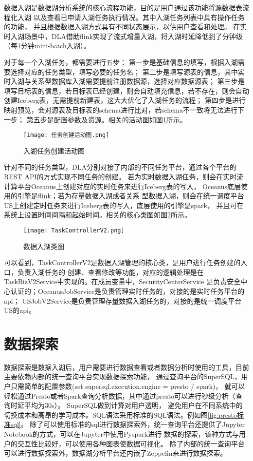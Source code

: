 数据入湖是数据湖分析系统的核心流程功能，目的是用户通过该功能将源数据表流程化入湖
以及查看已申请入湖任务执行情况。其中入湖任务列表中具有操作任务的功能，
并且根据数据入湖方式具有不同状态展示，以供用户查看和处理。
在实时入湖场景中，DLA借助flink实现了流式增量入湖，将入湖时延降低到了分钟级（每1分钟mini-batch入湖）。

对于每一个入湖任务，都需要进行五步：
第一步是基础信息的填写，根据入湖需要选择对应的任务类型，填写必要的任务名；
第二步是填写源表的信息，其中实时入湖与关系型数据库入湖需要提前注册数据源，选择对应数据源表；
第三步是填写目标表的信息，若目标表已经创建，则会自动填充信息，若不存在，则会自动创建Iceberg表，无需提前新建表，这大大优化了入湖任务的流程；
第四步是进行映射预览，会对源表及目标表的schema进行比对，若schema不一致将无法进行下一步；
第五步是配置参数及资源。相关的活动图如图\ref{fig:任务创建活动图}所示。

\begin{figure}[H]
  \centering
  \texttt{[image: 任务创建活动图.png]}
  \caption{入湖任务创建活动图}
  \label{fig:任务创建活动图}
\end{figure}

针对不同的任务类型，DLA分别对接了内部的不同任务平台，通过各个平台的REST API的方式实现不同任务的创建。
若为实时数据入湖任务，则会在实时流计算平台Oceanus上创建对应的实时任务来进行Iceberg表的写入，
Oceanus底层使用的引擎是flink；若为存量数据入湖或者关系
型数据入湖，则会在统一调度平台US上创建定时任务来进行Iceberg表的写入，底层使用的引擎是spark，
并且可在系统上设置时间间隔和起始时间。相关的核心类图如图\ref{fig:TaskControllerV2}所示。

\begin{figure}[H]
  \centering
  \texttt{[image: TaskControllerV2.png]}
  \caption{数据入湖类图}
  \label{fig:TaskControllerV2}
\end{figure}

可以看到，TaskControllerV2是数据入湖管理的核心类，是用户进行任务创建的入口，负责入湖任务的
创建、查看修改等功能，对应的逻辑处理是在TaskBizV2Service中实现的。在成员变量中，SecurityCenterService
是负责安全中心认证的；OceanusJobService是负责管理实时任务的，对接的是实时任务平台的api；
USJobV2Service是负责管理存量数据入湖任务的，对接的是统一调度平台US的api。

\section{数据探索}

数据探索是数据入湖后，用户需要进行数据查看或者数据分析时使用的工具，目前主要依赖内部的统一查询平台实现数据探索功能，
通过查询平台的SuperSQL，用户只需简单的配置参数(set supersql.execution.engine = presto / spark)，
就可以轻松通过Presto或者Spark查询分析数据，其中通过presto可以进行秒级分析（查询时延平均为30s）。
SuperSQL做到计算对用户透明，
避免用户在不同系统中的切换成本和高昂的学习成本。SQL语法采用标准的SQL语法。例如图\ref{fig:presto标准sql}。
除了可以使用标准的sql进行数据探索外，统一查询平台还提供了Jupyter Notebook的方式，可以在Jupyter中使用Pyspark进行
数据的探索，该种方式与用户的交互性比较好，可以使用各种图表使数据可视化。
除了内部的统一查询平台可以进行数据探索外，数据湖分析平台还内嵌了Zeppelin来进行数据探索。

